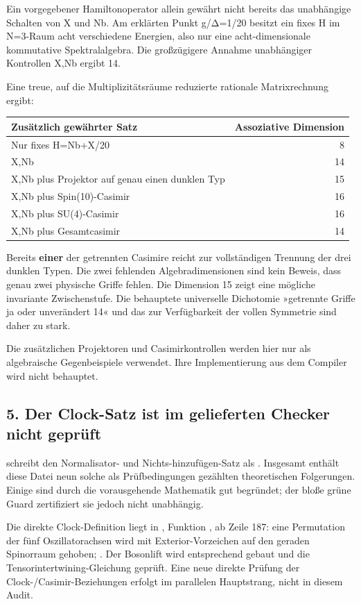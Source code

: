 Ein vorgegebener Hamiltonoperator allein gewährt nicht bereits das
unabhängige Schalten von X und Nb. Am erklärten Punkt g/Δ=1/20 besitzt
ein fixes H im N=3-Raum acht verschiedene Energien, also nur eine
acht-dimensionale kommutative Spektralalgebra. Die großzügigere Annahme
unabhängiger Kontrollen X,Nb ergibt 14.

Eine treue, auf die Multiplizitätsräume reduzierte rationale
Matrixrechnung ergibt:

{\def\LTcaptype{none} %
\begin{longtable}[]{@{}lr@{}}
\toprule\noalign{}
Zusätzlich gewährter Satz & Assoziative Dimension \\
\midrule\noalign{}
\endhead
\bottomrule\noalign{}
\endlastfoot
Nur fixes H=Nb+X/20 & 8 \\
X,Nb & 14 \\
X,Nb plus Projektor auf genau einen dunklen Typ & 15 \\
X,Nb plus Spin(10)-Casimir & 16 \\
X,Nb plus SU(4)-Casimir & 16 \\
X,Nb plus Gesamtcasimir & 14 \\
\end{longtable}
}

Bereits \textbf{einer} der getrennten Casimire reicht zur vollständigen
Trennung der drei dunklen Typen. Die zwei fehlenden Algebradimensionen
sind kein Beweis, dass genau zwei physische Griffe fehlen. Die Dimension
15 zeigt eine mögliche invariante Zwischenstufe. Die behauptete
universelle Dichotomie »getrennte Griffe ja oder unverändert 14« und das
 zur Verfügbarkeit der vollen Symmetrie sind
daher zu stark.

Die zusätzlichen Projektoren und Casimirkontrollen werden hier nur als
algebraische Gegenbeispiele verwendet. Ihre Implementierung aus dem
Compiler wird nicht behauptet.

\subsection{5. Der Clock-Satz ist im gelieferten Checker nicht
geprüft}\label{der-clock-satz-ist-im-gelieferten-checker-nicht-gepruxfcft}

 schreibt den Normalisator- und
Nichts-hinzufügen-Satz als . Insgesamt enthält
diese Datei neun solche als Prüfbedingungen gezählten theoretischen
Folgerungen. Einige sind durch die vorausgehende Mathematik gut
begründet; der bloße grüne Guard zertifiziert sie jedoch nicht
unabhängig.

Die direkte Clock-Definition liegt in
,
Funktion , ab Zeile 187: eine Permutation der fünf
Oszillatorachsen wird mit Exterior-Vorzeichen auf den geraden Spinorraum
gehoben; . Der Bosonlift wird entsprechend gebaut
und die Tensorintertwining-Gleichung geprüft. Eine neue direkte Prüfung
der Clock-/Casimir-Beziehungen erfolgt im parallelen Hauptstrang, nicht
in diesem Audit.

